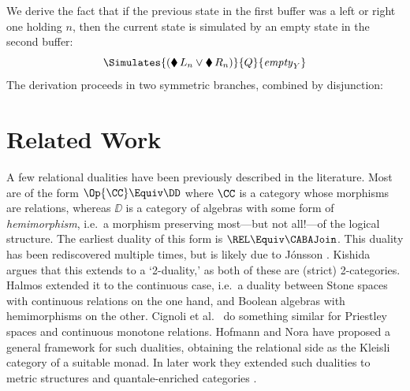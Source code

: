 We derive the fact that if the previous state in the first buffer was a left or right one holding $n$, then the current state is simulated by an empty state in the second buffer:
\[
  \Simulates{(\blacklozenge\, L_n \lor \blacklozenge\, R_n)}{Q}{\mathit{empty}_Y}
\]
The derivation proceeds in two symmetric branches, combined by disjunction:
\begin{mathpar}
\end{mathpar}

\section{Related Work}\label{section:related-work}

A few relational dualities have been previously described in the literature.
Most are of the form $\Op{\CC} \Equiv \DD$ where $\CC$ is a category whose
morphisms are relations, whereas $\DD$ is a category of algebras with some form
of \emph{hemimorphism}, i.e.\ a morphism preserving most---but not all!---of
the logical structure. The earliest duality of this form is $\REL \Equiv \CABAJoin$.
This duality has been rediscovered multiple times, but is likely due to
J\'{o}nsson \cite{jonsson_1951}. Kishida \cite[\S 2.3]{kishida_2018} argues that
this extends to a `2-duality,' as both of these are (strict) 2-categories.
Halmos \cite{halmos_1956} extended it to the continuous case, i.e.\ a duality
between Stone spaces with continuous relations on the one hand, and Boolean
algebras with hemimorphisms on the other. Cignoli et al.\ \cite{cignoli_1991} do
something similar for Priestley spaces and continuous monotone relations. Hofmann
and Nora \cite{hofmann_2015} have proposed a general framework for such
dualities, obtaining the relational side as the Kleisli category of a suitable
monad. In later work they extended such dualities to metric structures and
quantale-enriched categories \cite{hofmann_2023}.

